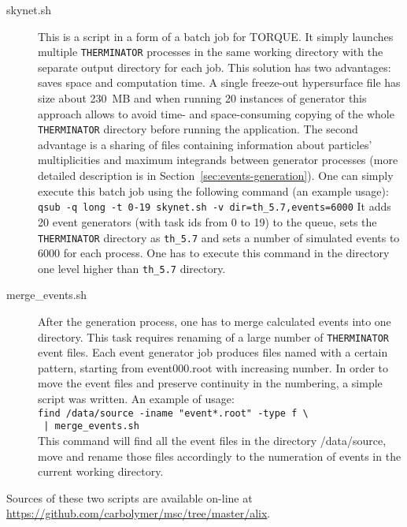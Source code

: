     \begin{description}
      \item[skynet.sh] This is a script in a form of a batch job for TORQUE.
        It simply launches multiple \verb|THERMINATOR| processes in the same working directory with the separate output directory for each job.
        This solution has two advantages: saves space and computation time.
        A single freeze-out hypersurface file has size about 230~MB and when running 20 instances of generator this approach allows to avoid time- and space-consuming copying of the whole \verb|THERMINATOR| directory before running the application.
        The second advantage is a sharing of files containing information about particles' multiplicities and maximum integrands between generator processes (more detailed description is in Section~\ref{sec:events-generation}).
        One can simply execute this batch job using the following command (an example usage):
        \\\verb|qsub -q long -t 0-19 skynet.sh -v dir=th_5.7,events=6000|
        It adds 20 event generators (with task ids from 0 to 19) to the queue, sets the \verb|THERMINATOR| directory as \verb|th_5.7| and sets a number of simulated events to 6000 for each process.
        One has to execute this command in the directory one level higher than \verb|th_5.7| directory.
      \item[merge\_events.sh] After the generation process, one has to merge calculated events into one directory.
        This task requires renaming of a large number of \verb|THERMINATOR| event files.
        Each event generator job produces files named with a certain pattern, starting from event000.root with increasing number.
        In order to move the event files and preserve continuity in the numbering, a simple script was written.
        An example of usage:
        \\\verb&find /data/source -iname "event*.root" -type f \ &
        \\\verb& | merge_events.sh&\\
        This command will find all the event files in the directory /data/source, move and rename those files accordingly to the numeration of events in the current working directory.
    \end{description}
    Sources of these two scripts are available on-line at \url{https://github.com/carbolymer/msc/tree/master/alix}.
